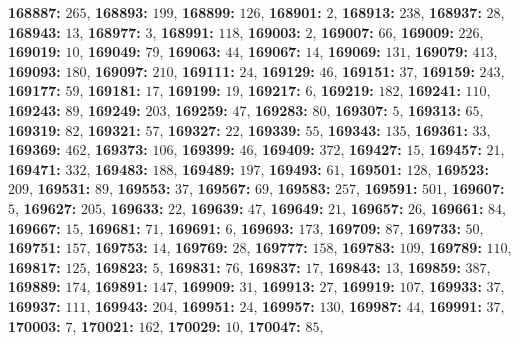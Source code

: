 \textsf{\bfseries 168887:} $265$, \textsf{\bfseries 168893:} $199$, \textsf{\bfseries 168899:} $126$, \textsf{\bfseries 168901:} $2$, \textsf{\bfseries 168913:} $238$, \textsf{\bfseries 168937:} $28$, \textsf{\bfseries 168943:} $13$, \textsf{\bfseries 168977:} $3$, \textsf{\bfseries 168991:} $118$, \textsf{\bfseries 169003:} $2$, \textsf{\bfseries 169007:} $66$, \textsf{\bfseries 169009:} $226$, \textsf{\bfseries 169019:} $10$, \textsf{\bfseries 169049:} $79$, \textsf{\bfseries 169063:} $44$, \textsf{\bfseries 169067:} $14$, \textsf{\bfseries 169069:} $131$, \textsf{\bfseries 169079:} $413$, \textsf{\bfseries 169093:} $180$, \textsf{\bfseries 169097:} $210$, \textsf{\bfseries 169111:} $24$, \textsf{\bfseries 169129:} $46$, \textsf{\bfseries 169151:} $37$, \textsf{\bfseries 169159:} $243$, \textsf{\bfseries 169177:} $59$, \textsf{\bfseries 169181:} $17$, \textsf{\bfseries 169199:} $19$, \textsf{\bfseries 169217:} $6$, \textsf{\bfseries 169219:} $182$, \textsf{\bfseries 169241:} $110$, \textsf{\bfseries 169243:} $89$, \textsf{\bfseries 169249:} $203$, \textsf{\bfseries 169259:} $47$, \textsf{\bfseries 169283:} $80$, \textsf{\bfseries 169307:} $5$, \textsf{\bfseries 169313:} $65$, \textsf{\bfseries 169319:} $82$, \textsf{\bfseries 169321:} $57$, \textsf{\bfseries 169327:} $22$, \textsf{\bfseries 169339:} $55$, \textsf{\bfseries 169343:} $135$, \textsf{\bfseries 169361:} $33$, \textsf{\bfseries 169369:} $462$, \textsf{\bfseries 169373:} $106$, \textsf{\bfseries 169399:} $46$, \textsf{\bfseries 169409:} $372$, \textsf{\bfseries 169427:} $15$, \textsf{\bfseries 169457:} $21$, \textsf{\bfseries 169471:} $332$, \textsf{\bfseries 169483:} $188$, \textsf{\bfseries 169489:} $197$, \textsf{\bfseries 169493:} $61$, \textsf{\bfseries 169501:} $128$, \textsf{\bfseries 169523:} $209$, \textsf{\bfseries 169531:} $89$, \textsf{\bfseries 169553:} $37$, \textsf{\bfseries 169567:} $69$, \textsf{\bfseries 169583:} $257$, \textsf{\bfseries 169591:} $501$, \textsf{\bfseries 169607:} $5$, \textsf{\bfseries 169627:} $205$, \textsf{\bfseries 169633:} $22$, \textsf{\bfseries 169639:} $47$, \textsf{\bfseries 169649:} $21$, \textsf{\bfseries 169657:} $26$, \textsf{\bfseries 169661:} $84$, \textsf{\bfseries 169667:} $15$, \textsf{\bfseries 169681:} $71$, \textsf{\bfseries 169691:} $6$, \textsf{\bfseries 169693:} $173$, \textsf{\bfseries 169709:} $87$, \textsf{\bfseries 169733:} $50$, \textsf{\bfseries 169751:} $157$, \textsf{\bfseries 169753:} $14$, \textsf{\bfseries 169769:} $28$, \textsf{\bfseries 169777:} $158$, \textsf{\bfseries 169783:} $109$, \textsf{\bfseries 169789:} $110$, \textsf{\bfseries 169817:} $125$, \textsf{\bfseries 169823:} $5$, \textsf{\bfseries 169831:} $76$, \textsf{\bfseries 169837:} $17$, \textsf{\bfseries 169843:} $13$, \textsf{\bfseries 169859:} $387$, \textsf{\bfseries 169889:} $174$, \textsf{\bfseries 169891:} $147$, \textsf{\bfseries 169909:} $31$, \textsf{\bfseries 169913:} $27$, \textsf{\bfseries 169919:} $107$, \textsf{\bfseries 169933:} $37$, \textsf{\bfseries 169937:} $111$, \textsf{\bfseries 169943:} $204$, \textsf{\bfseries 169951:} $24$, \textsf{\bfseries 169957:} $130$, \textsf{\bfseries 169987:} $44$, \textsf{\bfseries 169991:} $37$, \textsf{\bfseries 170003:} $7$, \textsf{\bfseries 170021:} $162$, \textsf{\bfseries 170029:} $10$, \textsf{\bfseries 170047:} $85$, 
